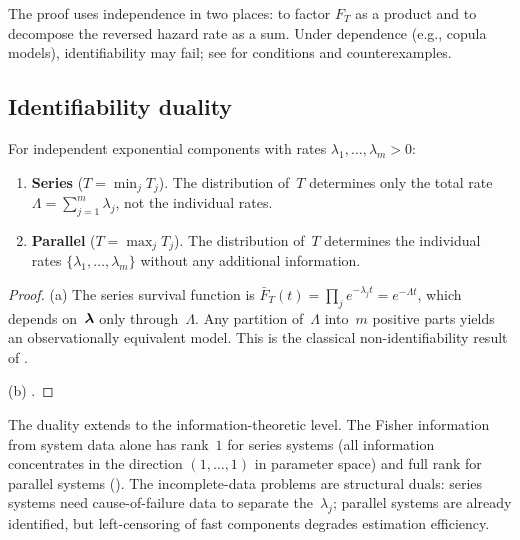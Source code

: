 \begin{remark}\label{rmk:identifiability-role-of-independence}
The proof uses independence in two places: to factor $F_T$ as a product and
to decompose the reversed hazard rate as a sum.  Under dependence (e.g.,
copula models), identifiability may fail; see \citet{BasuGhosh1978} for
conditions and counterexamples.
\end{remark}

\subsection{Identifiability duality}
\label{sec:id-duality}

\begin{corollary}\label{cor:duality}
  For independent exponential components with rates
  $\lambda_1, \ldots, \lambda_m > 0$:
  \begin{enumerate}
    \item[\textup{(a)}] \textbf{Series} ($T = \min_j T_j$).  The distribution
      of~$T$ determines only the total rate
      $\Lambda = \sum_{j=1}^m \lambda_j$, not the individual rates.
    \item[\textup{(b)}] \textbf{Parallel} ($T = \max_j T_j$).  The distribution
      of~$T$ determines the individual rates
      $\{\lambda_1, \ldots, \lambda_m\}$ without any additional information.
  \end{enumerate}
\end{corollary}

\begin{proof}
(a) The series survival function is
$\bar{F}_T(t) = \prod_j e^{-\lambda_j t} = e^{-\Lambda t}$, which depends
on~$\boldsymbol{\lambda}$ only through~$\Lambda$.  Any partition of~$\Lambda$ into~$m$
positive parts yields an observationally equivalent model.  This is
the classical non-identifiability result of \citet{Tsiatis1975}.

(b) .
\end{proof}

\begin{remark}\label{rmk:duality-information}
The duality extends to the information-theoretic level.  The Fisher
information from system data alone has rank~$1$ for series systems (all
information concentrates in the direction $(1, \ldots, 1)$ in parameter
space) and full rank for parallel systems ().  The
incomplete-data problems are structural duals: series systems need
cause-of-failure data to separate the~$\lambda_j$; parallel systems are
already identified, but left-censoring of fast components degrades
estimation efficiency.
\end{remark}

